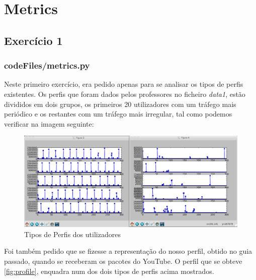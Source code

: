 \documentclass[pdftex,12pt,a4paper]{report}
\begin{document}
\renewcommand{\headrulewidth}{0pt}

\fancyhead{}
\fancyfoot{}
\rfoot{\thepage}

\renewcommand*\contentsname{Conteúdos}
\renewcommand*\figurename{Figura}
\renewcommand*\tablename{Tabela}

\tableofcontents
\renewcommand{\headrulewidth}{0.15pt}
\renewcommand{\thechapter}{}

\clearpage

\section{Metrics}
\subsection{Exercício 1}
\subsubsection{codeFiles/metrics.py}
Neste primeiro exercício, era pedido apenas para se analisar os tipos de perfis existentes. Os perfis que foram dados pelos professores no ficheiro \textit{data1}, estão divididos em dois grupos, os primeiros 20 utilizadores com um tráfego mais periódico e os restantes com um tráfego mais irregular, tal como podemos verificar na imagem seguinte:

\begin{figure}[!htb]
\center
 \includegraphics[width=150mm,scale=1]{metrics/typesOfServices.png}
 \caption{Tipos de Perfis dos utilizadores}
 \label{fig:typeOfServices}
\end{figure}

Foi também pedido que se fizesse a representação do nosso perfil, obtido no guia passado, quando se receberam os pacotes do YouTube. O perfil que se obteve \ref{fig:profile}, enquadra num dos dois tipos de perfis acima mostrados.
\end{document}
